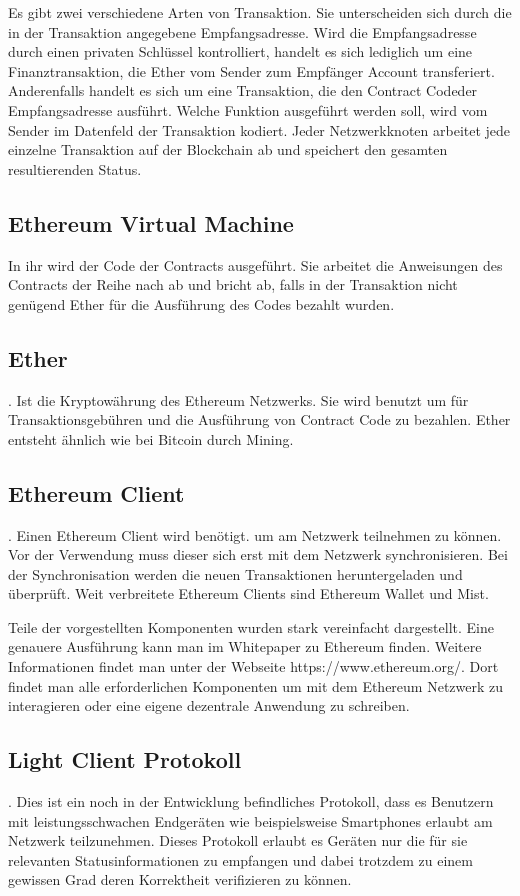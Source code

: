 Es gibt zwei verschiedene Arten von Transaktion. Sie unterscheiden sich durch die in der Transaktion angegebene Empfangsadresse. 
Wird die Empfangsadresse durch einen privaten Schlüssel kontrolliert, handelt es sich lediglich um eine Finanztransaktion, die Ether vom Sender zum Empfänger Account transferiert. Anderenfalls handelt es sich um eine Transaktion, die den Contract Codeder Empfangsadresse ausführt. Welche Funktion ausgeführt werden soll, wird vom Sender im Datenfeld der Transaktion kodiert. Jeder Netzwerkknoten arbeitet jede einzelne Transaktion auf der Blockchain ab und speichert den gesamten resultierenden Status. 
\subsection{Ethereum Virtual Machine}
In ihr wird der Code der Contracts ausgeführt. Sie arbeitet die Anweisungen des Contracts der Reihe nach ab und bricht ab, falls in der Transaktion nicht genügend Ether für die Ausführung des Codes bezahlt wurden.
\subsection{Ether}. 
Ist die Kryptowährung des Ethereum Netzwerks. Sie wird benutzt um für Transaktionsgebühren und die Ausführung von Contract Code zu bezahlen. Ether entsteht ähnlich wie bei Bitcoin durch Mining.
\subsection{Ethereum Client}. 
Einen Ethereum Client wird benötigt. um am Netzwerk teilnehmen zu können. Vor der Verwendung muss dieser sich erst mit dem Netzwerk synchronisieren. Bei der Synchronisation werden die neuen Transaktionen heruntergeladen und überprüft. Weit verbreitete Ethereum Clients sind Ethereum Wallet und Mist.

Teile der vorgestellten Komponenten wurden stark vereinfacht dargestellt. Eine genauere Ausführung kann man im Whitepaper zu Ethereum finden. 
Weitere Informationen findet man unter der Webseite https://www.ethereum.org/. Dort findet man alle erforderlichen Komponenten um mit dem Ethereum Netzwerk zu interagieren oder eine eigene dezentrale Anwendung zu schreiben. 

\subsection{Light Client Protokoll}. 
Dies ist ein noch in der Entwicklung befindliches Protokoll, dass es Benutzern mit leistungsschwachen Endgeräten wie beispielsweise Smartphones erlaubt am Netzwerk teilzunehmen. Dieses Protokoll erlaubt es Geräten nur die für sie relevanten Statusinformationen zu empfangen und dabei trotzdem zu einem gewissen Grad deren Korrektheit verifizieren zu können.

\fi